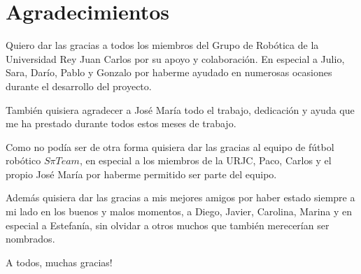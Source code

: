 \chapter* {Agradecimientos}

Quiero dar las gracias a todos los miembros del Grupo de Robótica de
la Universidad Rey Juan Carlos por su apoyo y colaboración. En especial
a Julio, Sara, Darío, Pablo y Gonzalo por haberme ayudado en numerosas ocasiones 
durante el desarrollo del proyecto.

También quisiera agradecer a José María todo el trabajo, dedicación y ayuda
que me ha prestado durante todos estos meses de trabajo.

Como no podía ser de otra forma quisiera dar las gracias al equipo de fútbol
robótico $S \pi Team$, en especial a los miembros de la URJC, Paco, Carlos y el 
propio José María por haberme permitido ser parte del equipo.

Además quisiera dar las gracias a mis mejores amigos por haber estado
siempre a mi lado en los buenos y malos momentos, 
a Diego, Javier, Carolina, Marina y en especial a Estefanía, 
sin olvidar a otros muchos que también merecerían ser nombrados.

A todos, muchas gracias!
